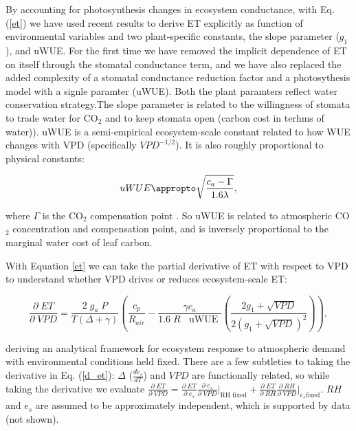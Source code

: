   By accounting for photosynthesis changes in ecosystem conductance,
  with Eq. (\ref{et}) we have used recent results
  \citep[][]{MEDLYN_2011, Zhou_2014, Zhou_2015, Medlyn_2017} to derive
  ET explicitly as function of environmental variables and two
  plant-specific constants, the slope parameter ($g_1$), and uWUE. For
  the first time we have removed the implicit dependence of ET on
  itself through the stomatal conductance term, and we have also
  replaced the added complexity of a stomatal conductance reduction
  factor and a photosythesis model with a signle paramter (uWUE). Both
  the plant paramters reflect water conservation strategy.The
  slope parameter is related to the willingness of stomata to trade
  water for CO$_2$ and to keep stomata open (carbon cost in terhms of
  water)). uWUE is a semi-empirical ecosystem-scale constant related
  to how WUE changes with VPD (specifically $VPD^{-1/2}$). It is also
  roughly proportional to physical constants:

\[uWUE \appropto \sqrt{\frac{c_a - \Gamma}{1.6 \lambda}},\]

where $\Gamma$ is the CO$_2$ compensation point \citep[Eq. (5)
in][]{Zhou_2014}. So uWUE is related to atmospheric CO$_2$
concentration and compensation point, and is inversely proportional to
the marginal water cost of leaf carbon.


With Equation \ref{et} we can take the partial derivative of ET with respect
to VPD to understand whether VPD drives or reduces ecosystem-scale ET:

  \begin{equation}
    \frac{\partial \;  ET}{\partial \; VPD} = \frac{2\; g_a \;
      P}{T(\Delta + \gamma)}   \left(\frac{ c_p}{R_{air}} -
      \frac{\gamma c_a }{1.6 \; R\; \; \text{ uWUE }} \left(
        \frac{2 g_1 + \sqrt{VPD}}{2 (g_1 + \sqrt{VPD})^2}\right)
    \right),
    \label{d_et}
  \end{equation}

  deriving an analytical framework for ecosystem response to
  atmospheric demand with environmental conditions held
  fixed. There are a few subtleties to taking the derivative in
  Eq. (\ref{d_et}): $\Delta$ ($\frac{d e_{s}}{d T}$) and $VPD$ are
  functionally related, so while taking the derivative we evaluate
  $\frac{\partial \; ET}{\partial \; VPD} = \frac{\partial \; ET}
  {\partial \; e_s} \frac{\partial \; e_s}{\partial \; VPD}
  \Big|_{\text{RH fixed}} + \frac{\partial \; ET}{\partial \; RH}
  \frac{\partial \; RH}{\partial \; VPD} \Big|_{\text{$e_s$
      fixed}}$. $RH$ and $e_s$ are assumed to be approximately
  independent, which is supported by data (not shown).

